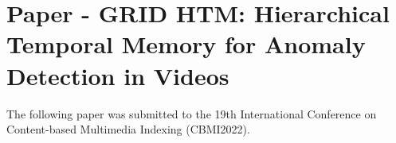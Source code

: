 \documentclass[USenglish]{ifimaster}  %
\begin{document}
\appendix
\chapter{Paper - GRID HTM: Hierarchical Temporal Memory for Anomaly Detection in Videos}
\label{appendix:paper}
The following paper was submitted to the 19th International Conference on Content-based Multimedia Indexing (CBMI2022).

\end{document}
